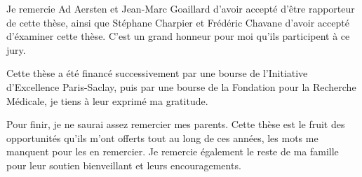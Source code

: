 \documentclass[11pt]{book}
\begin{document}
Je remercie Ad Aersten et Jean-Marc Goaillard d'avoir accepté d'être
rapporteur de cette thèse, ainsi que Stéphane Charpier et Frédéric
Chavane d'avoir accepté d'éxaminer cette thèse. C'est un grand honneur
pour moi qu'ils participent à ce jury.

Cette thèse a été financé successivement par une bourse de
l'Initiative d'Excellence Paris-Saclay, puis par une bourse de la
Fondation pour la Recherche Médicale, je tiens à leur exprimé ma
gratitude.

Pour finir, je ne saurai assez remercier mes parents. Cette thèse est
le fruit des opportunités qu'ils m'ont offerts tout au long de ces
années, les mots me manquent pour les en remercier. Je remercie
également le reste de ma famille pour leur soutien bienveillant et
leurs encouragements.









\end{document}
